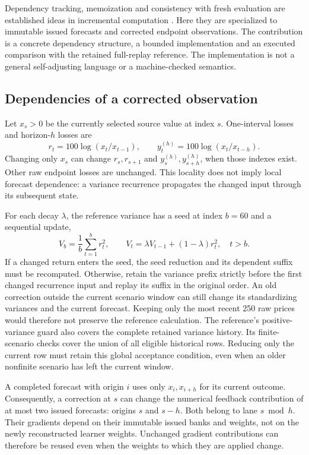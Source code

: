 \documentclass[11pt,a4paper]{article}
\theoremstyle{definition}\newtheorem{definition}[theorem]{Definition}
\begin{document}
Dependency tracking, memoization and consistency with fresh evaluation are established ideas in incremental computation \cite{acar2013consistent}. Here they are specialized to immutable issued forecasts and corrected endpoint observations. The contribution is a concrete dependency structure, a bounded implementation and an executed comparison with the retained full-replay reference. The implementation is not a general self-adjusting language or a machine-checked semantics.

\subsection{Dependencies of a corrected observation}
Let $x_s>0$ be the currently selected source value at index $s$. One-interval losses and horizon-$h$ losses are
\[
 r_t=100\log(x_t/x_{t-1}),\qquad
 y_t^{(h)}=100\log(x_t/x_{t-h}).
\]
Changing only $x_s$ can change $r_s,r_{s+1}$ and $y_s^{(h)},y_{s+h}^{(h)}$, when those indexes exist. Other raw endpoint losses are unchanged. This locality does not imply local forecast dependence: a variance recurrence propagates the changed input through its subsequent state.

For each decay $\lambda$, the reference variance has a seed at index $b=60$ and a sequential update,
\begin{equation}
 V_b=\frac1b\sum_{t=1}^{b}r_t^2,\qquad
 V_t=\lambda V_{t-1}+(1-\lambda)r_t^2,\quad t>b.
 \label{eq:incrementalvariance}
\end{equation}
If a changed return enters the seed, the seed reduction and its dependent suffix must be recomputed. Otherwise, retain the variance prefix strictly before the first changed recurrence input and replay its suffix in the original order. An old correction outside the current scenario window can still change its standardizing variances and the current forecast. Keeping only the most recent 250 raw prices would therefore not preserve the reference calculation. The reference's positive-variance guard also covers the complete retained variance history. Its finite-scenario checks cover the union of all eligible historical rows. Reducing only the current row must retain this global acceptance condition, even when an older nonfinite scenario has left the current window.

A completed forecast with origin $i$ uses only $x_i,x_{i+h}$ for its current outcome. Consequently, a correction at $s$ can change the numerical feedback contribution of at most two issued forecasts: origins $s$ and $s-h$. Both belong to lane $s\bmod h$. Their gradients depend on their immutable issued banks and weights, not on the newly reconstructed learner weights. Unchanged gradient contributions can therefore be reused even when the weights to which they are applied change.
\end{document}
